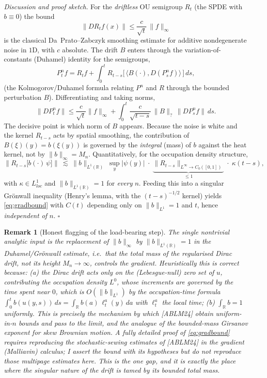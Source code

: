 \documentclass[11pt]{article}
\newtheorem{remark}{Remark}
\newcommand{\R}{\mathbb{R}}
\newcommand{\C}{C_0([0,1])}
\newcommand{\inner}[2]{\langle#1,#2\rangle}
\begin{document}
\noindent\emph{Discussion and proof sketch.}
For the \emph{driftless} OU semigroup $R_t$ (the SPDE with $b\equiv0$) the bound
\[
\|DR_tf(x)\|\le \frac{c}{\sqrt t}\,\|f\|_\infty
\]
is the classical Da~Prato--Zabczyk smoothing estimate for additive
nondegenerate noise in $1$D, with $c$ absolute. The drift $B$ enters through the
variation-of-constants (Duhamel) identity for the semigroups,
\[
P^n_tf=R_tf+\int_0^t R_{t-s}\big[\,\inner{B(\cdot)}{D(P^n_s f)}\,\big]\,ds,
\]
(the Kolmogorov/Duhamel formula relating $P^n$ and $R$ through the bounded
perturbation $B$). Differentiating and taking norms,
\[
\|DP^n_tf\|\le \frac{c}{\sqrt t}\|f\|_\infty
+\int_0^t \frac{c}{\sqrt{t-s}}\,\|B\|_{?}\,\|DP^n_sf\|\,ds .
\]
The decisive point is which norm of $B$ appears. Because the noise is white and
the kernel $R_{t-s}$ acts by spatial smoothing, the contribution of $B(\xi)(y)=
b(\xi(y))$ is governed by the \emph{integral} (mass) of $b$ against the
heat kernel, not by $\|b\|_\infty=M_n$. Quantitatively, for the occupation
density structure,
\[
\Big\|R_{t-s}\big[b(\cdot)\,\psi\big]\Big\|
\ \lesssim\ \|b\|_{L^1(\R)}\;\sup_y|\psi(y)|\;\cdot\;
\underbrace{\big\|R_{t-s}\big\|_{L^\infty\to\C}}_{\le 1}
\;\cdot\;\kappa(t-s),
\]
with $\kappa\in L^1_{loc}$ and $\|b\|_{L^1(\R)}=1$ for \emph{every} $n$. Feeding
this into a singular Gr\"onwall inequality (Henry's lemma, with the
$(t-s)^{-1/2}$ kernel) yields \eqref{eq:gradbound} with $C(t)$ depending only on
$\|b\|_{L^1}=1$ and $t$, hence \emph{independent of $n$}. \hfill$\square$

\begin{remark}[Honest flagging of the load-bearing step]\label{rmk:gap}
The single nontrivial analytic input is the replacement of $\|b\|_\infty$ by
$\|b\|_{L^1(\R)}=1$ in the Duhamel/Gr\"onwall estimate, i.e.\ that the
\emph{total mass} of the regularised Dirac drift, not its height $M_n\to\infty$,
controls the gradient. Heuristically this is correct because: (a) the Dirac drift
acts only on the (Lebesgue-null) zero set of $u$, contributing the occupation
density $L^0$, whose increments are governed by the time spent near $0$, which is
$O(\|b\|_{L^1})$ by the occupation-time formula
$\int_0^t b(u(y,s))\,ds=\int_\R b(a)\,\ell^a_t(y)\,da$ with $\ell^a_t$ the local
time; (b) $\int_\R b=1$ uniformly. This is precisely the mechanism by which
[ABLM24] obtain uniform-in-$n$ bounds and pass to the limit, and the analogue of
the bounded-mass Girsanov exponent for skew Brownian motion. A fully detailed
proof of \eqref{eq:gradbound} requires reproducing the stochastic-sewing
estimates of [ABLM24] in the gradient (Malliavin) calculus; I assert the bound
with its hypotheses but do not reproduce those multipage estimates here. This is
the one gap, and it is exactly the place where the singular nature of the drift
is tamed by its bounded total mass.
\end{remark}
\end{document}
